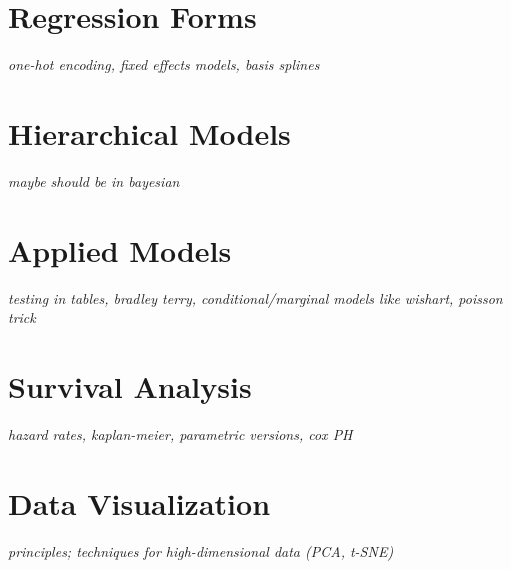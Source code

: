 \documentclass[../../../main.tex]{subfiles}
\begin{document}

\section{Regression Forms}
\textit{one-hot encoding, fixed effects models, basis splines}

\section{Hierarchical Models}
\textit{maybe should be in bayesian}

\section{Applied Models}
\textit{testing in tables, bradley terry, conditional/marginal models like wishart, poisson trick}

\section{Survival Analysis}
\textit{hazard rates, kaplan-meier, parametric versions, cox PH}

\section{Data Visualization}
\textit{principles; techniques for high-dimensional data (PCA, t-SNE)}

\printbibliography[
    heading=subbibintoc,
    title={References}
]
\end{document}
